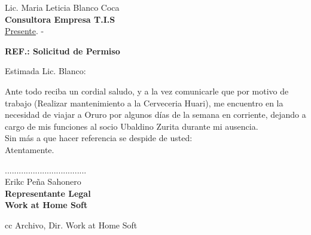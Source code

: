 \documentclass[letterpaper,12pt]{letter}
\begin{document}
\date {Cochabamba, \today}
\begin{letter}{Lic. Maria Leticia Blanco Coca \\ {\bf Consultora Empresa T.I.S} \\ \underline {Presente}. -}

\begin{center}
	\opening{ \textbf{ REF.: Solicitud de Permiso }}
\end{center}

Estimada Lic. Blanco:

Ante todo reciba un cordial saludo, y a la vez comunicarle que por motivo de trabajo (Realizar mantenimiento a la Cerveceria Huari), me encuentro en la necesidad de viajar a Oruro por algunos días de la semana en corriente, dejando a cargo de mis funciones al socio Ubaldino Zurita durante mi ausencia.\\

Sin más a que hacer referencia se despide de usted:\\
 
Atentamente.

\vspace{0.50cm}

\begin{center}
...................................\\
Erikc Peña Sahonero\\
{\bfseries Representante Legal \\ Work at Home Soft}
\end{center}
\vspace{0.25cm}
cc Archivo, Dir. Work at Home Soft
\end{letter}
\end{document}
